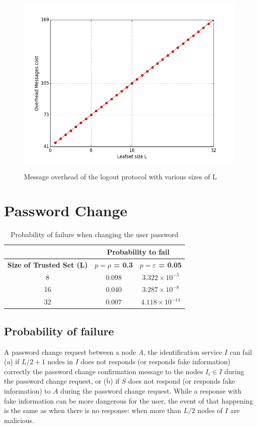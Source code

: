 \begin{figure}[!htb]
\centering
\includegraphics[width=14cm]{../plots/logout_messages}\\
\caption{Message overhead of the logout protocol with various sizes of L}
\label{fig:logout_messages}
\end{figure}

\section{Password Change}
  \label{sec:eval_password_change}
  \begin{table}
    \centering
    \footnotesize
    \begin{tabular}{|c|c|c|}
      \cline{2-3}
      \multicolumn{1}{c|}{}&  \multicolumn{2}{c|}{\textbf{Probability to fail}} \\ \cline{2-3}
      \hline
      \textbf{Size of Trusted Set (L)} & \textbf{$p = \rho$ = 0.3} &  \textbf{$p = \varepsilon$ = 0.05}  \\
      \hline \hline
      8 &  $0.098$ & $3.322 \times 10^{-5}$ \\
      \hline
      16 & $0.040$ & $3.287 \times 10^{-8}$  \\
      \hline
      32 & $0.007$ & $4.118 \times 10^{-14}$  \\
      \hline
    \end{tabular}
    \caption{Probability of failure when changing the user password}
    \label{tab:p_password_change}
  \end{table}
  
  \subsection{Probability of failure}
    A password change request between a node $A$, the identification service
$I$ can fail (a) if $L/2 + 1$ nodes in $I$ does not responds (or responds fake
information) correctly the password change confirmation message to the nodes 
$I_i \in I$ during the password change request, or (b) if $S$ does not respond (or responds fake information) to $A$
during the password change request. While a response with fake information can be more dangerous for the
user, the event of that happening is the same as when there is no response:
when more than $L/2$ nodes of $I$ are malicious.

